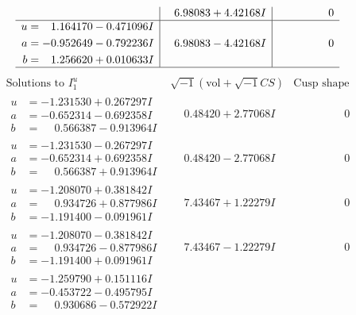 \documentclass[1p]{elsarticle_modified}
\theoremstyle{definition}
\newcommand{\I}{\sqrt{-1}}
\begin{document}
$$\begin{array}{c|c|c}
 & \phantom{-}6.98083 + 4.42168 I & \phantom{-0.000000 } 0 \\ \hline\begin{aligned}
u &= \phantom{-}1.164170 - 0.471096 I \\
a &= -0.952649 - 0.792236 I \\
b &= \phantom{-}1.256620 + 0.010633 I\end{aligned}
 & \phantom{-}6.98083 - 4.42168 I & \phantom{-0.000000 } 0\\
 \hline 
 \end{array}$$\newpage$$\begin{array}{c|c|c}  
\text{Solutions to }I^u_{1}& \I (\text{vol} + \sqrt{-1}CS) & \text{Cusp shape}\\
 \hline 
\begin{aligned}
u &= -1.231530 + 0.267297 I \\
a &= -0.652314 - 0.692358 I \\
b &= \phantom{-}0.566387 - 0.913964 I\end{aligned}
 & \phantom{-}0.48420 + 2.77068 I & \phantom{-0.000000 } 0 \\ \hline\begin{aligned}
u &= -1.231530 - 0.267297 I \\
a &= -0.652314 + 0.692358 I \\
b &= \phantom{-}0.566387 + 0.913964 I\end{aligned}
 & \phantom{-}0.48420 - 2.77068 I & \phantom{-0.000000 } 0 \\ \hline\begin{aligned}
u &= -1.208070 + 0.381842 I \\
a &= \phantom{-}0.934726 + 0.877986 I \\
b &= -1.191400 - 0.091961 I\end{aligned}
 & \phantom{-}7.43467 + 1.22279 I & \phantom{-0.000000 } 0 \\ \hline\begin{aligned}
u &= -1.208070 - 0.381842 I \\
a &= \phantom{-}0.934726 - 0.877986 I \\
b &= -1.191400 + 0.091961 I\end{aligned}
 & \phantom{-}7.43467 - 1.22279 I & \phantom{-0.000000 } 0 \\ \hline\begin{aligned}
u &= -1.259790 + 0.151116 I \\
a &= -0.453722 - 0.495795 I \\
b &= \phantom{-}0.930686 - 0.572922 I\end{aligned}

\end{array}$$
\end{document}
